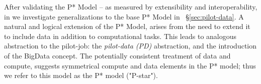 \documentclass[conference,final]{IEEEtran}
\newcommand{\jhanote}[1]{ {\textcolor{red} { ***shantenu: #1 }}}
\newcommand{\alnote}[1]{ {\textcolor{blue} { ***andre: #1 }}}
\newcommand{\alnote}[1]{}
\newcommand{\jhanote}[1]{}
\begin{document}
After validating the P* Model -- as measured by extensibility and
interoperability, in we investigate generalizations to the base P*
Model in \ \S\ref{sec:pilot-data}.  A natural and logical extension of
the P* Model, arises from the need to extend it to include data in
addition to computational tasks.  This leads to analogous abstraction
to the pilot-job: the \emph{pilot-data (PD)} abstraction, and the
introduction of the BigData concept. The potentially consistent
treatment of data and compute, suggests symmetrical compute and data
elements in the P* model; thus we refer to this model as the P* model
("P-star").













\end{document}
